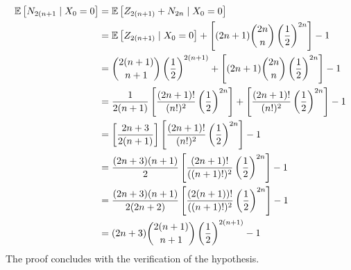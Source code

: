 \documentclass[12pt]{article}%
\begin{document}
\begin{enumerate}
        \begin{align*}
          \mathbb{E}\left[{N_{2(n+1}}\mid {X_{0} = 0}\right] & = \mathbb{E}\left[{Z_{2(n+1)} + N_{2n}}\mid {X_0 = 0}\right] \\
                                         & = \mathbb{E}\left[{Z_{2(n+1)}}\mid {X_0 = 0}\right] + \left[(2n+1)\binom{2n}{n}\left(\frac{1}{2}\right)^{2n}\right] -1 \\
                                         & =  \binom{2(n+1)}{n+1}\left(\frac{1}{2}\right)^{2(n+1)} + \left[(2n+1)\binom{2n}{n}\left(\frac{1}{2}\right)^{2n}\right] -1\\
                                         & = \frac{1}{2(n+1)}\left[\frac{(2n+1)!}{(n!)^{2}}\left(\frac{1}{2}\right)^{2n}\right] + \left[\frac{(2n+1)!}{(n!)^{2}}\left(\frac{1}{2}\right)^{2n}\right] - 1 \\
                                         & = \left[\frac{2n+3}{2(n+1)}\right]\left[\frac{(2n+1)!}{(n!)^{2}}\left(\frac{1}{2}\right)^{2n}\right] - 1 \\
                                         & = \frac{(2n+3)(n+1)}{2}\left[\frac{(2n+1)!}{((n+1)!)^{2}}\left(\frac{1}{2}\right)^{2n}\right] - 1 \\
                                         & = \frac{(2n+3)(n+1)}{2(2n +2)}\left[\frac{(2(n+1))!}{((n+1)!)^{2}}\left(\frac{1}{2}\right)^{2n}\right] - 1 \\
          & = (2n + 3) \binom{2(n+1)}{n+1}\left(\frac{1}{2}\right)^{2(n+1)} - 1
        \end{align*}
The proof concludes with the verification of the hypothesis.
\end{enumerate}
\end{document}
